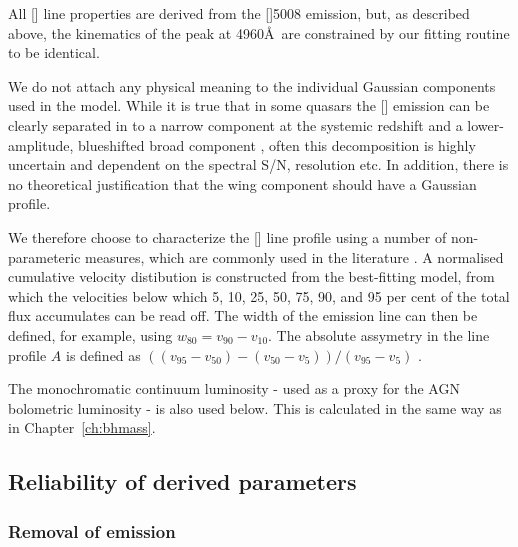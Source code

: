 All [] line properties are derived from the []5008 emission, but, as described above, the kinematics of the peak at 4960\AA\, are constrained by our fitting routine to be identical.

We do not attach any physical meaning to the individual Gaussian components used in the model. 
While it is true that in some quasars the [] emission can be clearly separated in to a narrow component at the systemic redshift and a lower-amplitude, blueshifted broad component \citep[e.g.][]{shen16a}, often this decomposition is highly uncertain and dependent on the spectral \ac{S/N}, resolution etc.
In addition, there is no theoretical justification that the wing component should have a Gaussian profile.  

We therefore choose to characterize the [] line profile using a number of non-parameteric measures, which are commonly used in the literature \citep[e.g.][]{zakamska14,zakamska16}. 
A normalised cumulative velocity distibution is constructed from the best-fitting model, from which the velocities below which 5, 10, 25, 50, 75, 90, and 95 per cent of the total flux accumulates can be read off. 
The width of the emission line can then be defined, for example, using $w_{80} = v_{90} - v_{10}$. 
The absolute assymetry in the line profile $A$ is defined as $((v_{95} - v_{50}) - (v_{50} - v_{5})) / (v_{95} - v_{5})$ \citep{zakamska14}. 

The monochromatic continuum luminosity - used as a proxy for the \ac{AGN} bolometric luminosity - is also used below. 
This is calculated in the same way as in Chapter~\ref{ch:bhmass}. 

\subsection{Reliability of derived parameters}

\subsubsection{Removal of  emission}

